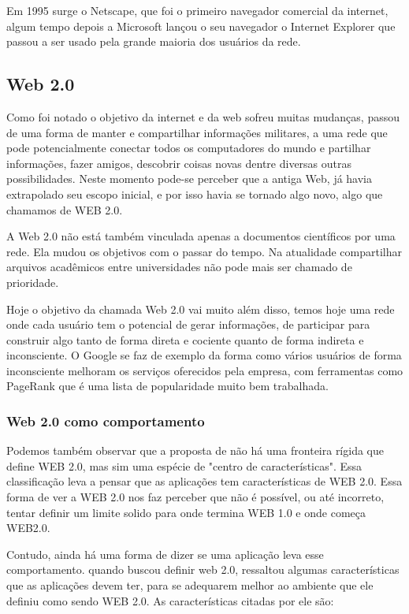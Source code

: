 \documentclass[
	12pt,				%
	openright,			%
	twoside,			%
	a4paper,			%
	Times,
	brazil,				%
	]{abntex2}
\begin{document}
Em 1995 surge o Netscape, que foi o primeiro navegador comercial da internet, algum tempo depois a Microsoft lançou o seu navegador o Internet Explorer que passou a ser usado pela grande maioria dos usuários da rede. \cite{web}
\par

\subsection{Web 2.0}

Como foi notado o objetivo da internet e da web sofreu muitas mudanças, passou de uma forma de manter e compartilhar informações militares, a uma rede que pode potencialmente conectar todos os computadores do mundo e partilhar informações, fazer amigos, descobrir coisas novas dentre diversas outras possibilidades. Neste momento pode-se perceber que a antiga Web, já havia extrapolado seu escopo inicial, e por isso havia se tornado algo novo, algo que chamamos de WEB 2.0. \cite{ARPANET, historia-internt, web, web2.0}
\par

A Web 2.0 não está também vinculada apenas a documentos científicos por uma rede. Ela mudou os objetivos com o passar do tempo. Na atualidade compartilhar arquivos acadêmicos entre universidades não pode mais ser chamado de prioridade. \cite{web2.0}
\par

Hoje o objetivo da chamada Web 2.0 vai muito além disso, temos hoje uma rede onde cada usuário tem o potencial de gerar informações, de participar para construir algo tanto de forma direta e cociente quanto de forma indireta e inconsciente. O Google se faz de exemplo da forma como vários usuários de forma inconsciente melhoram os serviços oferecidos pela empresa, com ferramentas como PageRank que é uma lista de popularidade muito bem trabalhada.\cite{google, web2.0}
\par

\subsubsection{Web 2.0 como comportamento}
Podemos também observar que a proposta de  não há uma fronteira rígida que define WEB 2.0, mas sim uma espécie de "centro de características". Essa classificação leva a pensar que as aplicações tem características de WEB 2.0. Essa forma de ver a WEB 2.0 nos faz perceber que não é possível, ou até incorreto, tentar definir um limite solido para onde termina WEB 1.0 e onde começa WEB2.0.
\par
Contudo, ainda há uma forma de dizer se uma aplicação leva esse comportamento.  quando buscou definir web 2.0, ressaltou algumas características que as aplicações devem ter, para se adequarem melhor ao ambiente que ele definiu como sendo WEB 2.0. As características citadas por ele são:
\par
\end{document}
